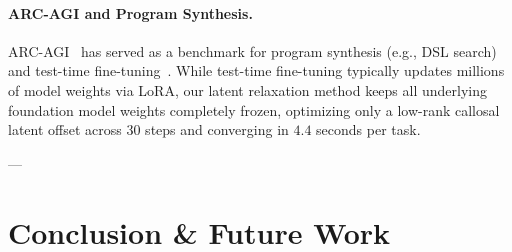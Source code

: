 \documentclass[11pt,a4paper]{article}
\theoremstyle{plain}
\theoremstyle{definition}
\theoremstyle{remark}
\begin{document}
\paragraph{ARC-AGI and Program Synthesis.}
ARC-AGI~\cite{chollet2019arc} has served as a benchmark for program synthesis (e.g., DSL search) and test-time fine-tuning~\cite{greenblatt2024arc}. While test-time fine-tuning typically updates millions of model weights via LoRA, our latent relaxation method keeps all underlying foundation model weights completely frozen, optimizing only a low-rank callosal latent offset across 30 steps and converging in $4.4$ seconds per task.

---

\section{Conclusion \& Future Work}
\label{sec:conclusion}
\end{document}
